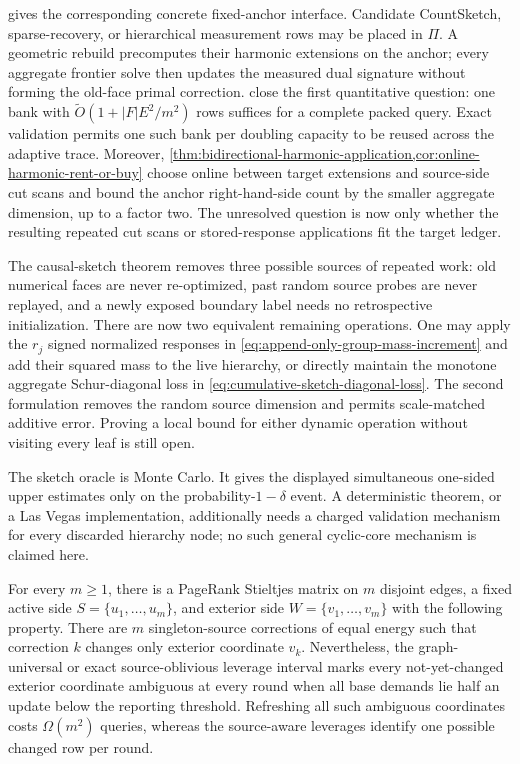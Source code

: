  gives the corresponding concrete
fixed-anchor interface.  Candidate CountSketch, sparse-recovery, or
hierarchical measurement rows may be placed in $\Pi$.  A geometric rebuild
precomputes their harmonic extensions on the anchor; every aggregate frontier
solve then updates the measured dual signature without forming the old-face
primal correction.  
close the first quantitative question: one
bank with $\widetilde O(1+|F|E^2/m^2)$ rows suffices for a complete packed
query.  Exact validation permits one such bank per doubling capacity to be
reused across the adaptive trace.  Moreover,
\cref{thm:bidirectional-harmonic-application,cor:online-harmonic-rent-or-buy}
choose online between target extensions and source-side cut scans and bound
the anchor right-hand-side count by the smaller aggregate dimension, up to a
factor two.  The unresolved question is now only whether the resulting
repeated cut scans or stored-response applications fit the target ledger.

The causal-sketch theorem removes three possible sources of repeated work: old numerical
faces are never re-optimized, past random source probes are never replayed,
and a newly exposed boundary label needs no retrospective initialization.
There are now two equivalent remaining operations.  One may apply the $r_j$
signed normalized responses in
\cref{eq:append-only-group-mass-increment} and add their squared mass to the
live hierarchy, or directly maintain the monotone aggregate Schur-diagonal
loss in \cref{eq:cumulative-sketch-diagonal-loss}.  The second formulation
removes the random source dimension and permits scale-matched additive error.
Proving a local bound for either dynamic operation without visiting every leaf
is still open.

The sketch oracle is Monte Carlo.  It gives the displayed simultaneous
one-sided upper estimates only on the probability-$1-\delta$ event.  A
deterministic theorem, or a Las Vegas implementation, additionally needs a
charged validation mechanism for every discarded hierarchy node; no such
general cyclic-core mechanism is claimed here.

\begin{proposition}
\label{prop:uniform-interval-obstruction}
For every $m\geq1$, there is a PageRank Stieltjes matrix on $m$ disjoint
edges, a fixed active side $S=\{u_1,\ldots,u_m\}$, and exterior side
$W=\{v_1,\ldots,v_m\}$ with the following property.  There are $m$
singleton-source corrections of equal energy such that correction $k$ changes
only exterior coordinate $v_k$.  Nevertheless, the graph-universal or exact
source-oblivious leverage interval marks every not-yet-changed exterior
coordinate ambiguous at every round when all base demands lie half an update
below the reporting threshold.  Refreshing all such ambiguous coordinates
costs $\Omega(m^2)$ queries, whereas the source-aware leverages identify one
possible changed row per round.
\end{proposition}

